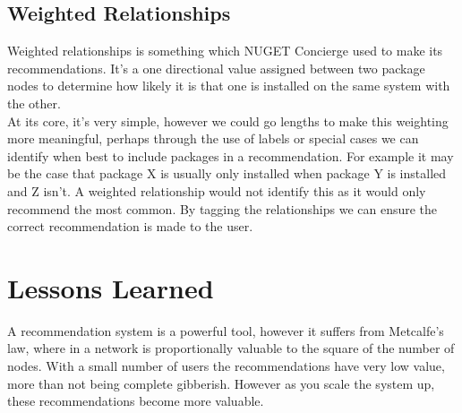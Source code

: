 \documentclass{l4proj}
\begin{document}
\subsection{Weighted Relationships} 
Weighted relationships is something which NUGET Concierge used to make its recommendations. It's a one directional value assigned between two package nodes to determine how likely it is that one is installed on the same system with the other.\\
At its core, it's very simple, however we could go lengths to make this weighting more meaningful, perhaps through the use of labels or special cases we can identify when best to include packages in a recommendation. For example it may be the case that package X is usually only installed when package Y is installed and Z isn't. A weighted relationship would not identify this as it would only recommend the most common. By tagging the relationships we can ensure the correct recommendation is made to the user.

\section{Lessons Learned}
A recommendation system is a powerful tool, however it suffers from Metcalfe's law, where in a network is proportionally valuable to the square of the number of nodes. With a small number of users the recommendations have very low value, more than not being complete gibberish. However as you scale the system up, these recommendations become more valuable.\\

 
 
 


\end{document}
